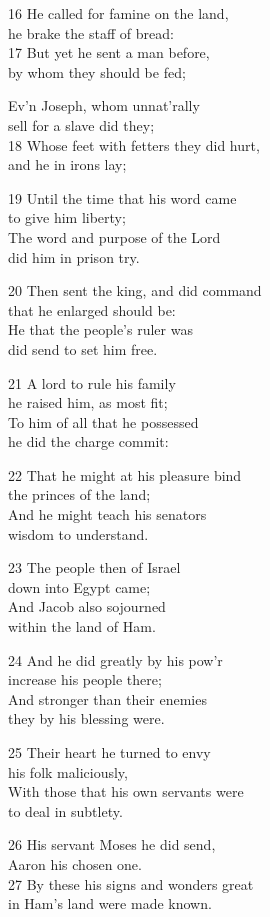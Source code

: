 16 He called for famine on the land,\\
he brake the staff of bread:\\
17 But yet he sent a man before,\\
by whom they should be fed;

Ev’n Joseph, whom unnat’rally\\
sell for a slave did they;\\
18 Whose feet with fetters they did hurt,\\
and he in irons lay;

19 Until the time that his word came\\
to give him liberty;\\
The word and purpose of the Lord\\
did him in prison try.

20 Then sent the king, and did command\\
that he enlarged should be:\\
He that the people’s ruler was\\
did send to set him free.

21 A lord to rule his family\\
he raised him, as most fit;\\
To him of all that he possessed\\
he did the charge commit:

22 That he might at his pleasure bind\\
the princes of the land;\\
And he might teach his senators\\
wisdom to understand.

23 The people then of Israel\\
down into Egypt came;\\
And Jacob also sojourned\\
within the land of Ham.

24 And he did greatly by his pow’r\\
increase his people there;\\
And stronger than their enemies\\
they by his blessing were.

25 Their heart he turned to envy\\
his folk maliciously,\\
With those that his own servants were\\
to deal in subtlety.

26 His servant Moses he did send,\\
Aaron his chosen one.\\
27 By these his signs and wonders great\\
in Ham’s land were made known.

